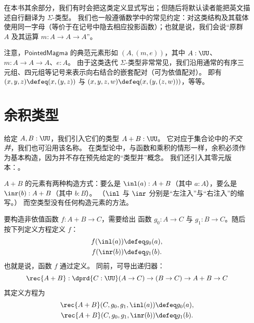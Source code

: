 在本书其余部分，我们有时会把这类定义显式写出；但随后将默认读者能把英文描述自行翻译为 $\Sigma$-类型。
我们也一般遵循数学中的常见约定：对这类结构及其载体使用同一字母（等价于在记号中隐去相应投影函数）；也就是说，我们会说“原群 $A$ 及其运算 $m:A\to A\to A$”。

注意，$\mathsf{PointedMagma}$ 的典范元素形如 $(A,(m,e))$，其中 $A:\UU$、$m:A\to A\to A$、$e:A$。
由于这类迭代 $\Sigma$-类型非常常见，我们沿用通常的有序三元组、四元组等记号来表示向右结合的嵌套配对（可为依值配对）。
即有 $(x,y,z) \defeq (x,(y,z))$ 与 $(x,y,z,w)\defeq (x,(y,(z,w)))$，等等。

%

\section{余积类型}
\label{sec:coproduct-types}

给定 $A,B:\UU$，我们引入它们的类型 $A+B:\UU$。
%
%
%
%
%
%
它对应于集合论中的\emph{不交并}，我们也可沿用该名称。
在类型论中，与函数和乘积的情形一样，余积必须作为基本构造，因为并不存在预先给定的“类型并”概念。
我们还引入其零元版本：。
%
%
%

$A+B$ 的元素有两种构造方式：要么是 $\inl(a) : A+B$（其中 $a:A$），要么是
$\inr(b):A+B$（其中 $b:B$）。
（$\inl$ 与 $\inr$ 分别是“左注入”与“右注入”的缩写。）
而空类型没有任何构造元素的方法。 

要构造非依值函数 $f : A+B \to C$，需要给出
函数 $g_0 : A \to C$ 与 $g_1 : B \to C$。随后按下列定义方程定义 $f$：
\begin{align*}
  f(\inl(a)) &\defeq g_0(a), \\
  f(\inr(b)) &\defeq g_1(b).
\end{align*}
也就是说，函数 $f$ 通过定义。
%
同前，可导出递归器：
%
\[ \rec{A+B} : \dprd{C:\UU}(A \to C) \to (B\to C) \to A+B \to C\]
其定义方程为
\begin{align*}
\rec{A+B}(C,g_0,g_1,\inl(a)) &\defeq g_0(a), \\
\rec{A+B}(C,g_0,g_1,\inr(b)) &\defeq g_1(b).
\end{align*}

